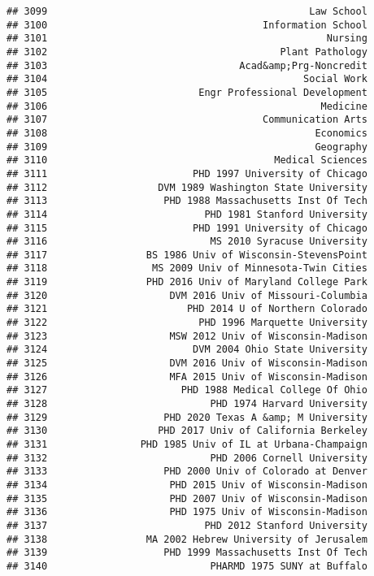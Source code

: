 \documentclass[
]{article}
\begin{document}
\begin{verbatim}
## 3099                                             Law School
## 3100                                     Information School
## 3101                                                Nursing
## 3102                                        Plant Pathology
## 3103                                 Acad&amp;Prg-Noncredit
## 3104                                            Social Work
## 3105                          Engr Professional Development
## 3106                                               Medicine
## 3107                                     Communication Arts
## 3108                                              Economics
## 3109                                              Geography
## 3110                                       Medical Sciences
## 3111                         PHD 1997 University of Chicago
## 3112                   DVM 1989 Washington State University
## 3113                    PHD 1988 Massachusetts Inst Of Tech
## 3114                           PHD 1981 Stanford University
## 3115                         PHD 1991 University of Chicago
## 3116                            MS 2010 Syracuse University
## 3117                 BS 1986 Univ of Wisconsin-StevensPoint
## 3118                  MS 2009 Univ of Minnesota-Twin Cities
## 3119                 PHD 2016 Univ of Maryland College Park
## 3120                     DVM 2016 Univ of Missouri-Columbia
## 3121                        PHD 2014 U of Northern Colorado
## 3122                          PHD 1996 Marquette University
## 3123                     MSW 2012 Univ of Wisconsin-Madison
## 3124                         DVM 2004 Ohio State University
## 3125                     DVM 2016 Univ of Wisconsin-Madison
## 3126                     MFA 2015 Univ of Wisconsin-Madison
## 3127                       PHD 1988 Medical College Of Ohio
## 3128                            PHD 1974 Harvard University
## 3129                    PHD 2020 Texas A &amp; M University
## 3130                   PHD 2017 Univ of California Berkeley
## 3131                PHD 1985 Univ of IL at Urbana-Champaign
## 3132                            PHD 2006 Cornell University
## 3133                    PHD 2000 Univ of Colorado at Denver
## 3134                     PHD 2015 Univ of Wisconsin-Madison
## 3135                     PHD 2007 Univ of Wisconsin-Madison
## 3136                     PHD 1975 Univ of Wisconsin-Madison
## 3137                           PHD 2012 Stanford University
## 3138                 MA 2002 Hebrew University of Jerusalem
## 3139                    PHD 1999 Massachusetts Inst Of Tech
## 3140                            PHARMD 1975 SUNY at Buffalo

\end{verbatim}
\end{document}
